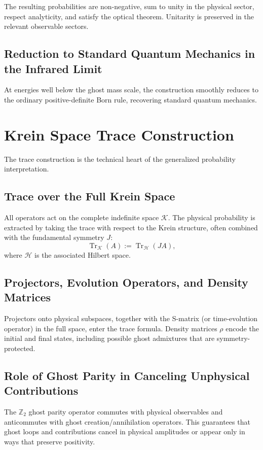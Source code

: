 \documentclass{article}
\begin{document}
The resulting probabilities are non-negative, sum to unity in the physical sector, respect analyticity, and satisfy the optical theorem. Unitarity is preserved in the relevant observable sectors.

\subsection{Reduction to Standard Quantum Mechanics in the Infrared Limit}

At energies well below the ghost mass scale, the construction smoothly reduces to the ordinary positive-definite Born rule, recovering standard quantum mechanics.

\section{Krein Space Trace Construction}
\label{sec:trace}

The trace construction is the technical heart of the generalized probability interpretation.

\subsection{Trace over the Full Krein Space}

All operators act on the complete indefinite space $\mathcal{K}$. The physical probability is extracted by taking the trace with respect to the Krein structure, often combined with the fundamental symmetry $J$:
\[
\operatorname{Tr}_{\mathcal{K}}(A) := \operatorname{Tr}_{\mathcal{H}} (J A),
\]
where $\mathcal{H}$ is the associated Hilbert space.

\subsection{Projectors, Evolution Operators, and Density Matrices}

Projectors onto physical subspaces, together with the S-matrix (or time-evolution operator) in the full space, enter the trace formula. Density matrices $\rho$ encode the initial and final states, including possible ghost admixtures that are symmetry-protected.

\subsection{Role of Ghost Parity in Canceling Unphysical Contributions}

The $\mathbb{Z}_2$ ghost parity operator commutes with physical observables and anticommutes with ghost creation/annihilation operators. This guarantees that ghost loops and contributions cancel in physical amplitudes or appear only in ways that preserve positivity.
\end{document}

